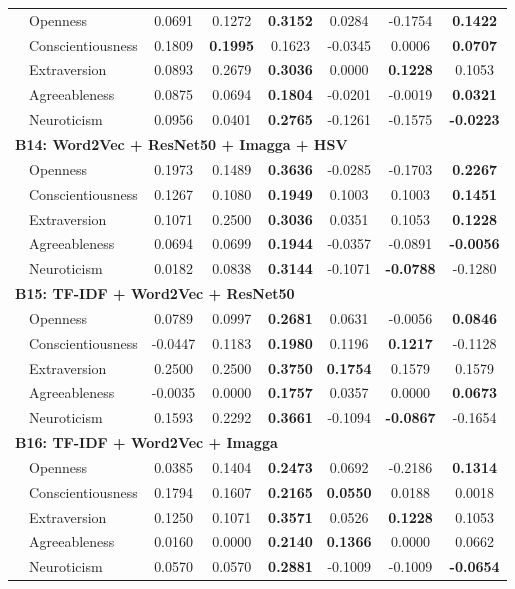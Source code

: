 \begin{longtable}{llcccccc}
& Openness & 0.0691 & 0.1272 & \textbf{0.3152} & 0.0284 & -0.1754 & \textbf{0.1422} \\
& Conscientiousness & 0.1809 & \textbf{0.1995} & 0.1623 & -0.0345 & 0.0006 & \textbf{0.0707} \\
& Extraversion & 0.0893 & 0.2679 & \textbf{0.3036} & 0.0000 & \textbf{0.1228} & 0.1053 \\
& Agreeableness & 0.0875 & 0.0694 & \textbf{0.1804} & -0.0201 & -0.0019 & \textbf{0.0321} \\
& Neuroticism & 0.0956 & 0.0401 & \textbf{0.2765} & -0.1261 & -0.1575 & \textbf{-0.0223} \\

\hline
\multicolumn{8}{l}{\textbf{B14: Word2Vec + ResNet50 + Imagga + HSV}} \\

& Openness & 0.1973 & 0.1489 & \textbf{0.3636} & -0.0285 & -0.1703 & \textbf{0.2267} \\
& Conscientiousness & 0.1267 & 0.1080 & \textbf{0.1949} & 0.1003 & 0.1003 & \textbf{0.1451} \\
& Extraversion & 0.1071 & 0.2500 & \textbf{0.3036} & 0.0351 & 0.1053 & \textbf{0.1228} \\
& Agreeableness & 0.0694 & 0.0699 & \textbf{0.1944} & -0.0357 & -0.0891 & \textbf{-0.0056} \\
& Neuroticism & 0.0182 & 0.0838 & \textbf{0.3144} & -0.1071 & \textbf{-0.0788} & -0.1280 \\

\hline
\multicolumn{8}{l}{\textbf{B15: TF-IDF + Word2Vec + ResNet50}} \\
& Openness & 0.0789 & 0.0997 & \textbf{0.2681} & 0.0631 & -0.0056 & \textbf{0.0846} \\
& Conscientiousness & -0.0447 & 0.1183 & \textbf{0.1980} & 0.1196 & \textbf{0.1217} & -0.1128 \\
& Extraversion & 0.2500 & 0.2500 & \textbf{0.3750} & \textbf{0.1754} & 0.1579 & 0.1579 \\
& Agreeableness & -0.0035 & 0.0000 & \textbf{0.1757} & 0.0357 & 0.0000 & \textbf{0.0673} \\
& Neuroticism & 0.1593 & 0.2292 & \textbf{0.3661} & -0.1094 & \textbf{-0.0867} & -0.1654 \\

\hline
\multicolumn{8}{l}{\textbf{B16: TF-IDF + Word2Vec + Imagga}} \\
& Openness & 0.0385 & 0.1404 & \textbf{0.2473} & 0.0692 & -0.2186 & \textbf{0.1314} \\
& Conscientiousness & 0.1794 & 0.1607 & \textbf{0.2165} & \textbf{0.0550} & 0.0188 & 0.0018 \\
& Extraversion & 0.1250 & 0.1071 & \textbf{0.3571} & 0.0526 & \textbf{0.1228} & 0.1053 \\
& Agreeableness & 0.0160 & 0.0000 & \textbf{0.2140} & \textbf{0.1366} & 0.0000 & 0.0662 \\
& Neuroticism & 0.0570 & 0.0570 & \textbf{0.2881} & -0.1009 & -0.1009 & \textbf{-0.0654} \\


\end{longtable}

